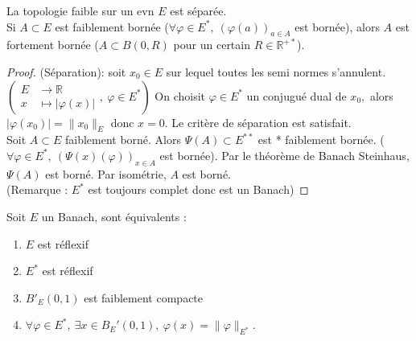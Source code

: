 \begin{corollaire}
    La topologie faible sur un evn $E$ est séparée.\\
    Si $A\subset E$ est faiblement bornée ($\forall \varphi \in E^*, \ \left( \varphi (a) \right) _{a\in A}$ est bornée), alors $A$ est fortement bornée ($A\subset B(0,R)$ pour un certain $R\in \mathbb{R} ^{+*}$).
\end{corollaire}
\begin{proof}
    (Séparation): soit $x_0\in E$ sur lequel toutes les semi normes s'annulent. $\left(\begin{aligned}
        E &\longrightarrow \mathbb{R}  \\
        x &\longmapsto |\varphi (x)|
    \end{aligned},~ \varphi \in E^*\right)$ On choisit $\varphi \in E^*$ un conjugué dual de $x_0,$ alors $|\varphi (x_0)| =\|x_0\|_E$ donc $x=0.$ Le critère de séparation est satisfait.\\
    Soit $A\subset E$ faiblement borné. Alors $\Psi(A)\subset E^{* *}$ est * faiblement bornée. ($\forall \varphi \in E^*,\ \left( \Psi(x)(\varphi ) \right) _{x\in A}$ est bornée). Par le théorème de Banach Steinhaus, $\Psi(A)$ est borné. Par isométrie, $A$ est borné.\\
    (Remarque : $E^*$ est toujours complet donc est un Banach)

\end{proof}
\begin{theoreme}
    Soit $E$ un Banach, sont équivalents :
    \begin{enumerate}[label=$(\roman*)$]
        \item $E$ est réflexif
        \item $E^*$ est réflexif
        \item $B'_E(0,1)$ est faiblement compacte
        \item $\forall \varphi \in E^*,\ \exists x\in B_E'(0,1),\ \varphi (x)=\|\varphi \|_{E^*}. $
    \end{enumerate}
\end{theoreme}
